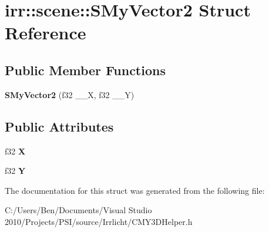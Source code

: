 \hypertarget{structirr_1_1scene_1_1_s_my_vector2}{\section{irr\-:\-:scene\-:\-:S\-My\-Vector2 Struct Reference}
\label{structirr_1_1scene_1_1_s_my_vector2}
}
\subsection*{Public Member Functions}
\begin{DoxyCompactItemize}
\item 
\hypertarget{structirr_1_1scene_1_1_s_my_vector2_a1c7ee533a64aa9da900cdca0a9d54116}{{\bfseries S\-My\-Vector2} (f32 \-\_\-\-\_\-\-X, f32 \-\_\-\-\_\-\-Y)}\label{structirr_1_1scene_1_1_s_my_vector2_a1c7ee533a64aa9da900cdca0a9d54116}

\end{DoxyCompactItemize}
\subsection*{Public Attributes}
\begin{DoxyCompactItemize}
\item 
\hypertarget{structirr_1_1scene_1_1_s_my_vector2_aaf5a37b2777790648703d239c09c509d}{f32 {\bfseries X}}\label{structirr_1_1scene_1_1_s_my_vector2_aaf5a37b2777790648703d239c09c509d}

\item 
\hypertarget{structirr_1_1scene_1_1_s_my_vector2_a0ac1b78d0a0ece8da9b9af4a1643958c}{f32 {\bfseries Y}}\label{structirr_1_1scene_1_1_s_my_vector2_a0ac1b78d0a0ece8da9b9af4a1643958c}

\end{DoxyCompactItemize}


The documentation for this struct was generated from the following file\-:\begin{DoxyCompactItemize}
\item 
C\-:/\-Users/\-Ben/\-Documents/\-Visual Studio 2010/\-Projects/\-P\-S\-I/source/\-Irrlicht/C\-M\-Y3\-D\-Helper.\-h\end{DoxyCompactItemize}
